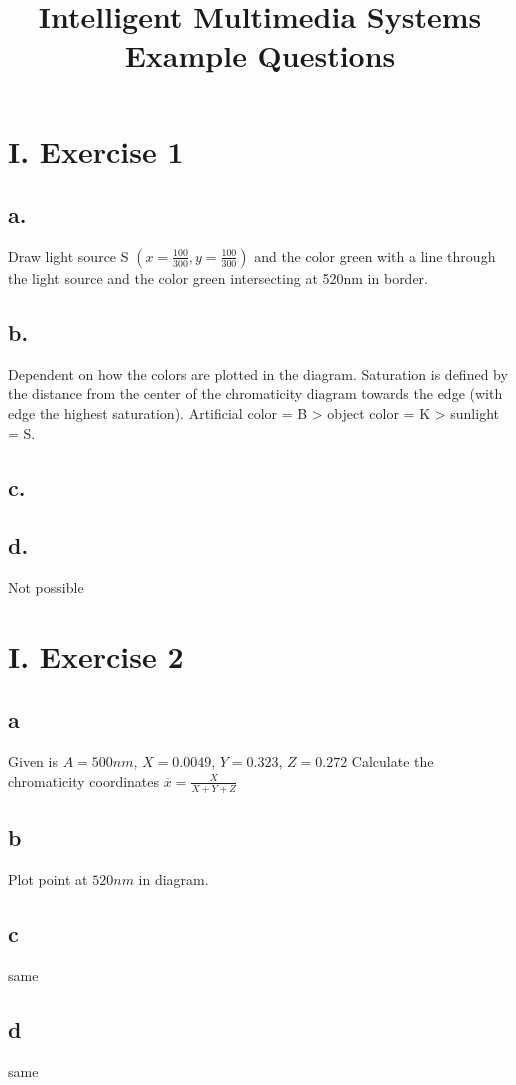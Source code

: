 \documentclass[a4paper,11pt]{article}
\title{Intelligent Multimedia Systems \\ Example Questions}
\newcommand{\ol}{\overline}
\begin{document}
	\maketitle
	
	\section*{I. Exercise 1}
	\subsection*{a.} Draw light source S $(x=\frac{100}{300}, y=\frac{100}{300})$ and the color green with a line through the light source and the color green intersecting at 520nm in border.  
	\subsection*{b.} Dependent on how the colors are plotted in the diagram. Saturation is defined by the distance from the center of the chromaticity diagram towards the edge (with edge the highest saturation). Artificial color = B > object color = K > sunlight = S.
	\subsection*{c.} 
	\subsection*{d.} Not possible\\
	\section*{I. Exercise 2}
	\subsection*{a}
		Given is $A=500nm$, $X=0.0049$, $Y=0.323$, $Z=0.272$
		Calculate the chromaticity coordinates $\ol{x}=\frac{X}{X+Y+Z}$ \\
	\subsection*{b}
		Plot point at $520nm$ in diagram.
	\subsection*{c}
		same 
	\subsection*{d}	
		same 
\end{document}
